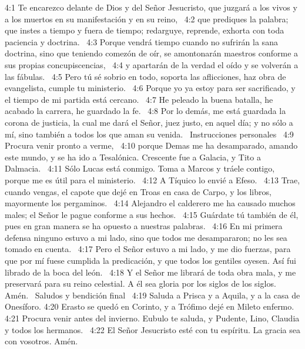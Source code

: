 4:1 Te encarezco delante de Dios y del Señor Jesucristo, que juzgará a los vivos y a los muertos en su manifestación y en su reino,  
4:2 que prediques la palabra; que instes a tiempo y fuera de tiempo; redarguye, reprende, exhorta con toda paciencia y doctrina.  
4:3 Porque vendrá tiempo cuando no sufrirán la sana doctrina, sino que teniendo comezón de oír, se amontonarán maestros conforme a sus propias concupiscencias,  
4:4 y apartarán de la verdad el oído y se volverán a las fábulas.  
4:5 Pero tú sé sobrio en todo, soporta las aflicciones, haz obra de evangelista, cumple tu ministerio.  
4:6 Porque yo ya estoy para ser sacrificado, y el tiempo de mi partida está cercano.  
4:7 He peleado la buena batalla, he acabado la carrera, he guardado la fe.  
4:8 Por lo demás, me está guardada la corona de justicia, la cual me dará el Señor, juez justo, en aquel día; y no sólo a mí, sino también a todos los que aman su venida.  
Instrucciones personales  
4:9 Procura venir pronto a verme,  
4:10 porque Demas me ha desamparado, amando este mundo, y se ha ido a Tesalónica. Crescente fue a Galacia, y Tito a Dalmacia.  
4:11 Sólo Lucas está conmigo. Toma a Marcos y tráele contigo, porque me es útil para el ministerio.  
4:12 A Tíquico lo envié a Efeso.  
4:13 Trae, cuando vengas, el capote que dejé en Troas en casa de Carpo, y los libros, mayormente los pergaminos.  
4:14 Alejandro el calderero me ha causado muchos males; el Señor le pague conforme a sus hechos.  
4:15 Guárdate tú también de él, pues en gran manera se ha opuesto a nuestras palabras.  
4:16 En mi primera defensa ninguno estuvo a mi lado, sino que todos me desampararon; no les sea tomado en cuenta.  
4:17 Pero el Señor estuvo a mi lado, y me dio fuerzas, para que por mí fuese cumplida la predicación, y que todos los gentiles oyesen. Así fui librado de la boca del león.  
4:18 Y el Señor me librará de toda obra mala, y me preservará para su reino celestial. A él sea gloria por los siglos de los siglos. Amén.  
Saludos y bendición final  
4:19 Saluda a Prisca y a Aquila, y a la casa de Onesíforo. 
4:20 Erasto se quedó en Corinto, y a Trófimo dejé en Mileto enfermo.  
4:21 Procura venir antes del invierno. Eubulo te saluda, y Pudente, Lino, Claudia y todos los hermanos.  
4:22 El Señor Jesucristo esté con tu espíritu. La gracia sea con vosotros. Amén.  